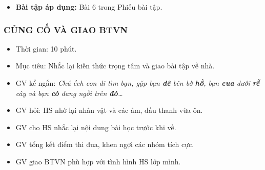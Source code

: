 \documentclass[../main.tex]{subfiles}
\begin{document}
\begin{itemize}
    \item[-] \textbf{Bài tập áp dụng:} Bài 6 trong Phiếu bài tập.
\end{itemize}

\subsubsection{CỦNG CỐ VÀ GIAO BTVN}
\begin{hd}
    \begin{itemize}
        \item Thời gian: 10 phút.
        \item Mục tiêu: Nhắc lại kiến thức trọng tâm và giao bài tập về nhà.
    \end{itemize}
\end{hd}
\begin{itemize}
    \item[-] GV kể ngắn: \textit{Chú ếch con đi tìm bạn, gặp bạn \textbf{dê} bên bờ \textbf{hồ}, bạn \textbf{cua} dưới \textbf{rễ} cây và bạn \textbf{cò} đang ngồi trên \textbf{đò}\dots}
    \item[-] GV hỏi:  HS nhớ lại nhân vật và các âm, dấu thanh vừa ôn.
\end{itemize}
\begin{itemize}
    \item[-] GV cho HS nhắc lại nội dung bài học trước khi về.
    \item[-] GV tổng kết điểm thi đua, khen ngợi các nhóm tích cực.
    \item[-] GV giao BTVN phù hợp với tình hình HS lớp mình.
\end{itemize}
\end{document}
